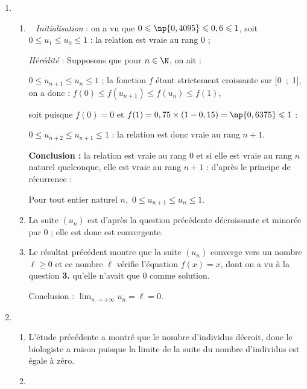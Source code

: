 \begin{enumerate}[resume]
\item 
	\begin{enumerate}
		\item ~%
\emph{Initialisation} : on a vu que $0 \leqslant \np{0,4095} \leqslant 0,6 \leqslant 1$, soit $0 \leqslant u_1 \leqslant u_0\leqslant 1$ : la relation est vraie au rang $0$ ;

\emph{Hérédité} : Supposons que pour $n \in \N$, on ait :

$0 \leqslant u_{n+1} \leqslant  u_n \leqslant 1$ ; la fonction $f$ étant strictement croissante sur [0~;~1], on a donc :
$f(0) \leqslant f\left(u_{n+1}\right) \leqslant f\left(u_n\right) \leqslant f(1)$, 

soit puisque $f(0) = 0$ et $f(1) = 0,75 \times (1 - 0,15) = \np{0,6375} \leqslant 1$ :

$0 \leqslant u_{n+2} \leqslant u_{n+1} \leqslant  1$ : la relation est donc vraie au rang $n + 1$.

\textbf{Conclusion :} la relation est vraie au rang 0 et si elle est vraie au rang $n$ naturel quelconque, elle est vraie au rang $n+1$ : d'après le principe de récurrence :

Pour tout entier naturel $n$,\, $0 \leqslant u_{n+1} \leqslant  u_n \leqslant 1$.	
		
		\item %
La suite $\left(u_n\right)$ est d'après la question précédente décroissante et minorée par $0$ ; elle est donc est convergente.
		\item %
Le résultat précédent montre que la suite $\left(u_n\right)$ converge vers un nombre $\ell \geqslant 0$ et ce nombre $\ell$ vérifie l'équation $f(x) = x$, dont on a vu à la question \textbf{3.} qu'elle n'avait que $0$ comme solution.
		
Conclusion : $\displaystyle\lim_{n \to + \infty} u_n = \ell = 0$.
	\end{enumerate}
\item %
	\begin{enumerate}
		\item %
L'étude précédente a montré que le nombre d'individus décroit, donc le biologiste a raison puisque la limite de la suite du nombre d'individus est égale à zéro.
		\item %


\end{enumerate}
\end{enumerate}
